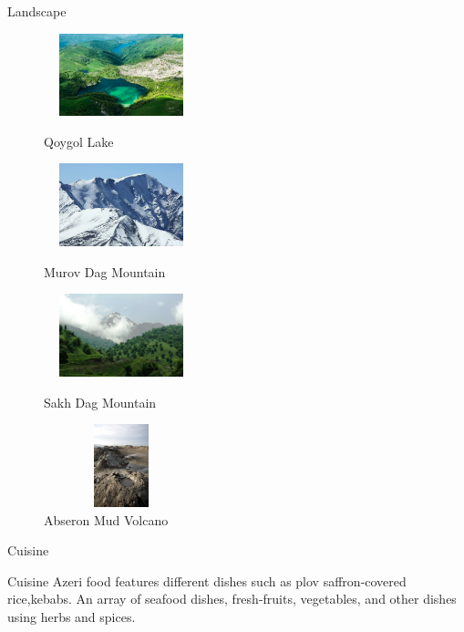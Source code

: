 \documentclass[hyperref={pdfpagemode=FullScreen}]{beamer}
\begin{document}
\begin{frame}{Landscape}
\begin{figure}
\begin{multicols}{2}
\centering
\includegraphics[width=4.5cm, height=2.4cm]{img/lake01.jpg}
 \caption{Qoygol Lake}

\includegraphics[width=4.5cm, height=2.4cm]{img/mount01.jpg}
 \caption{Murov Dag Mountain}
  \columnbreak
 
\includegraphics[width=4.5cm, height=2.4cm]{img/mount02.jpg}
\caption{Sakh Dag Mountain}

\includegraphics[width=4.5cm, height=2.4cm]{img/vul01.png}
\caption{Abseron Mud Volcano}
\end{multicols}
\end{figure}
\end{frame}

\begin{frame}{Cuisine}
\begin{alertblock}{Cuisine}
\justifying Azeri food features different dishes such as plov saffron-covered rice,kebabs. An array of seafood dishes, fresh-fruits, vegetables, and other dishes using herbs and spices.
\end{alertblock}
\end{frame}
\end{document}
